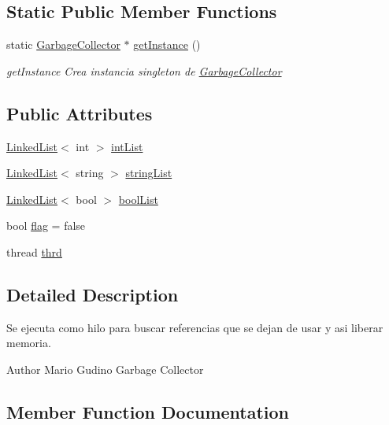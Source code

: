\subsection*{Static Public Member Functions}
\begin{DoxyCompactItemize}
\item 
static \hyperlink{class_garbage_collector}{Garbage\+Collector} $\ast$ \hyperlink{class_garbage_collector_ade4bccdf41223cc395b646db3f60ac8b}{get\+Instance} ()
\begin{DoxyCompactList}\small\item\em get\+Instance Crea instancia singleton de \hyperlink{class_garbage_collector}{Garbage\+Collector} \end{DoxyCompactList}\end{DoxyCompactItemize}
\subsection*{Public Attributes}
\begin{DoxyCompactItemize}
\item 
\hyperlink{class_linked_list}{Linked\+List}$<$ int $>$ \hyperlink{class_garbage_collector_a932495032998f28dab29ff9b0de2fb0e}{int\+List}
\item 
\hyperlink{class_linked_list}{Linked\+List}$<$ string $>$ \hyperlink{class_garbage_collector_a1928ce52cd7439716ed11be72c670879}{string\+List}
\item 
\hyperlink{class_linked_list}{Linked\+List}$<$ bool $>$ \hyperlink{class_garbage_collector_aa7d3cb13ece1181c1cab82e3d79b5489}{bool\+List}
\item 
bool \hyperlink{class_garbage_collector_a143761ba98ed540dd3cc2a488716bd80}{flag} = false
\item 
thread \hyperlink{class_garbage_collector_a7721f0c6f099fe71c61fd7e7bd0f6aae}{thrd}
\end{DoxyCompactItemize}


\subsection{Detailed Description}
Se ejecuta como hilo para buscar referencias que se dejan de usar y asi liberar memoria. 

\begin{DoxyAuthor}{Author}
Mario Gudino  Garbage Collector 
\end{DoxyAuthor}


\subsection{Member Function Documentation}
\mbox{\label{class_garbage_collector_a17875db60f5b050647bac7c3d3beec21}} 

